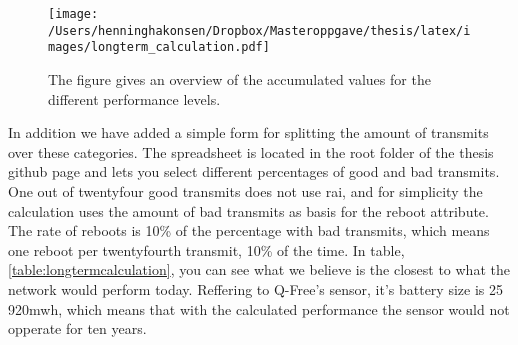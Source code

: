 \documentclass[USenglish]{ifimaster}  %
\begin{document}
\begin{figure}[H]
  \centering
  \texttt{[image: /Users/henninghakonsen/Dropbox/Masteroppgave/thesis/latex/images/longterm\_calculation.pdf]}
  \caption[Long-term accumulated performance chart]{The figure gives an overview of the accumulated values for the different performance levels.}
  \label{chart:longtermcalculation}
\end{figure}

In addition we have added a simple form for splitting the amount of transmits over these categories. The spreadsheet is located in the root folder of the thesis github page and lets you select different percentages of good and bad transmits. One out of twentyfour good transmits does not use \acrshort{rai}, and for simplicity the calculation uses the amount of bad transmits as basis for the reboot attribute. The rate of reboots is 10\% of the percentage with bad transmits, which means one reboot per twentyfourth transmit, 10\% of the time. In table, \vref{table:longtermcalculation}, you can see what we believe is the closest to what the network would perform today. Reffering to Q-Free's sensor, it's battery size is 25 920\acrshort{mwh}, which means that with the calculated performance the sensor would not opperate for ten years.

\begin{table}[H]
\centering
{}
\caption{Long-term accumulated calculation}
\label{table:longtermcalculation}
\end{table}
\end{document}
